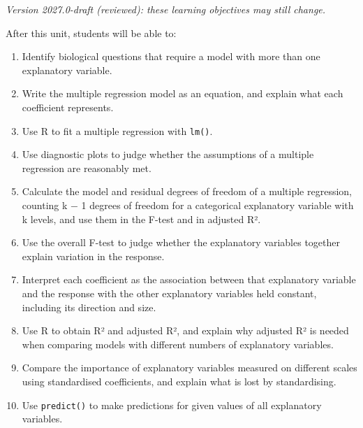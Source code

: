 \documentclass[
  letterpaper,
  8pt,
  a4paper]{book}
\providecommand{\tightlist}{%
  \setlength{\itemsep}{0pt}\setlength{\parskip}{0pt}}
\begin{document}
\begin{tcolorbox}[enhanced jigsaw, arc=.35mm, bottomrule=.15mm, bottomtitle=1mm, breakable, colback=white, colbacktitle=quarto-callout-note-color!10!white, colframe=quarto-callout-note-color-frame, coltitle=black, left=2mm, leftrule=.75mm, opacityback=0, opacitybacktitle=0.6, rightrule=.15mm, title=\textcolor{quarto-callout-note-color}{\faInfo}\hspace{0.5em}{Learning objectives}, titlerule=0mm, toprule=.15mm, toptitle=1mm]

\emph{Version 2027.0-draft (reviewed): these learning objectives may
still change.}

After this unit, students will be able to:

\begin{enumerate}
\def\labelenumi{\arabic{enumi}.}
\tightlist
\item
  Identify biological questions that require a model with more than one
  explanatory variable.
\item
  Write the multiple regression model as an equation, and explain what
  each coefficient represents.
\item
  Use R to fit a multiple regression with \texttt{lm()}.
\item
  Use diagnostic plots to judge whether the assumptions of a multiple
  regression are reasonably met.
\item
  Calculate the model and residual degrees of freedom of a multiple
  regression, counting k − 1 degrees of freedom for a categorical
  explanatory variable with k levels, and use them in the F-test and in
  adjusted R².
\item
  Use the overall F-test to judge whether the explanatory variables
  together explain variation in the response.
\item
  Interpret each coefficient as the association between that explanatory
  variable and the response with the other explanatory variables held
  constant, including its direction and size.
\item
  Use R to obtain R² and adjusted R², and explain why adjusted R² is
  needed when comparing models with different numbers of explanatory
  variables.
\item
  Compare the importance of explanatory variables measured on different
  scales using standardised coefficients, and explain what is lost by
  standardising.
\item
  Use \texttt{predict()} to make predictions for given values of all
  explanatory variables.

\end{enumerate}
\end{tcolorbox}
\end{document}
